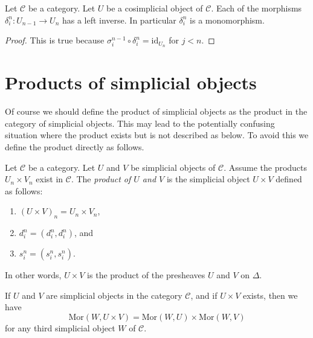 \begin{lemma}
\label{lemma-di-injective}
Let $\mathcal{C}$ be a category.
Let $U$ be a cosimplicial object of $\mathcal{C}$.
Each of the morphisms $\delta^n_i : U_{n - 1} \to U_n$
has a left inverse. In particular $\delta^n_i$ is a monomorphism.
\end{lemma}

\begin{proof}
This is true because
$\sigma_i^{n - 1} \circ \delta^n_i = \text{id}_{U_n}$
for $j < n$.
\end{proof}


























\section{Products of simplicial objects}
\label{section-products}

\noindent
Of course we should define the product of simplicial objects
as the product in the category of simplicial objects. This
may lead to the potentially confusing situation where the product exists
but is not described as below. To avoid this we define the product
directly as follows.

\begin{definition}
\label{definition-product}
Let $\mathcal{C}$ be a category.
Let $U$ and $V$ be simplicial objects of $\mathcal{C}$.
Assume the products $U_n \times V_n$ exist in $\mathcal{C}$.
The {\it product of $U$ and $V$} is the simplicial object
$U\times V$ defined as follows:
\begin{enumerate}
\item $(U \times V)_n = U_n \times V_n$,
\item $d^n_i = (d^n_i, d^n_i)$, and
\item $s^n_i = (s^n_i, s^n_i)$.
\end{enumerate}
In other words, $U\times V$ is the product of the presheaves
$U$ and $V$ on $\Delta$.
\end{definition}

\begin{lemma}
\label{lemma-product}
If $U$ and $V$ are simplicial objects in the category $\mathcal{C}$,
and if $U\times V$ exists, then we have
$$
\text{Mor}(W, U\times V) =
\text{Mor}(W, U) \times
\text{Mor}(W, V)
$$
for any third simplicial object $W$ of $\mathcal{C}$.
\end{lemma}

